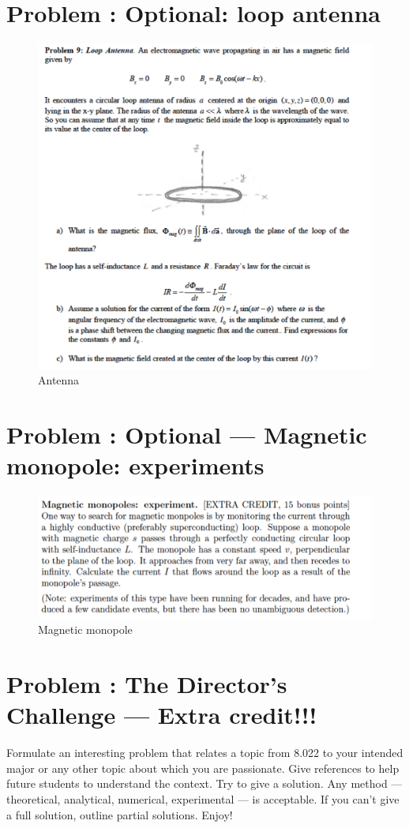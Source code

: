 \documentclass[problems]{esg8022pset}
\begin{document}
\section{Problem \thesection: Optional: loop antenna}
\begin{figure}[H]
    \centering
    \includegraphics[width = 15cm]{loopantenna}
    \caption{Antenna}
  \end{figure}
\section{Problem \thesection: Optional --- Magnetic monopole: experiments}

 \begin{figure}[H]
    \centering
    \includegraphics[width = 15cm]{monopoles}
    \caption{Magnetic monopole}
  \end{figure}

\section{Problem \thesection: The Director's Challenge --- Extra credit!!!}
  Formulate an interesting problem that relates a topic from 8.022 to your
  intended major or any other topic about which you are passionate.  Give references
  to help future students to understand the context.  Try to give a solution.
  Any method --- theoretical, analytical, numerical, experimental --- is acceptable.
  If you can't give a full solution, outline partial solutions. Enjoy!
\end{document}
